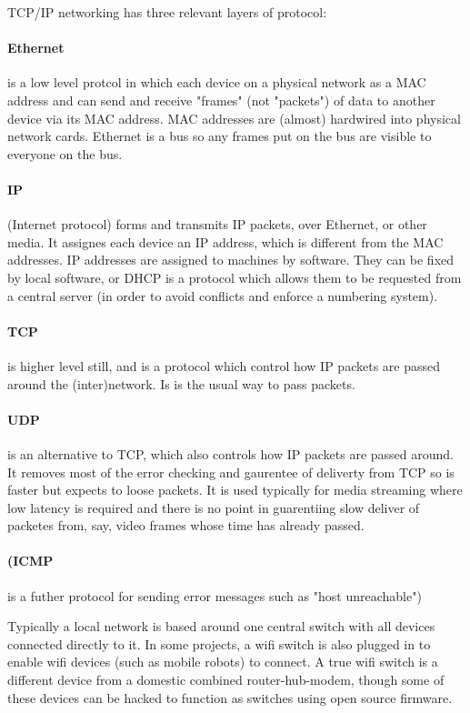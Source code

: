 \documentclass[oneside,english]{scrbook}
\begin{document}
TCP/IP networking has three relevant layers of protocol:

\paragraph{Ethernet} is a low level protcol in which each device on a physical network as a MAC address and can send and receive "frames" (not "packets") of data to another device via its MAC address. MAC addresses are (almost) hardwired into physical network cards. Ethernet is a bus so any frames put on the bus are visible to everyone on the bus.

\paragraph{IP} (Internet protocol) forms and transmits IP packets, over Ethernet, or other media.  It assignes each device an IP address, which is different from the MAC addresses. IP addresses are assigned to machines by software. They can be fixed by local software, or DHCP is a protocol which allows them to be requested from a central server (in order to avoid conflicts and enforce a numbering system).

\paragraph{TCP} is higher level still, and is a protocol which control how IP packets are passed around the (inter)network. Is is the usual way to pass packets.
\paragraph{UDP} is an alternative to TCP, which also controls how IP packets are passed around. It removes most of the error checking and gaurentee of deliverty from TCP so is faster but expects to loose packets. It is used typically for media streaming where low latency is required and there is no point in guarentiing slow deliver of packetes from, say, video frames whose time has already passed.

\paragraph{(ICMP} is a futher protocol for sending error messages such as "host unreachable")

Typically a local network is based around one central switch with
all devices connected directly to it. In some projects, a wifi switch
is also plugged in to enable wifi devices (such as mobile robots)
to connect. A true wifi switch is a different device from a domestic combined
router-hub-modem, though some of these devices can be hacked to function
as switches using open source firmware.
\end{document}
